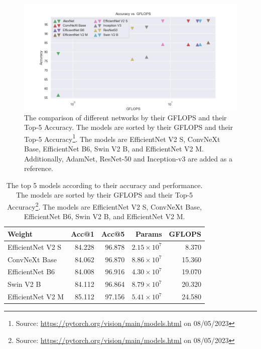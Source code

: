 \begin{figure}
  \centering
  \includegraphics[width=\linewidth]{figures/network/networks.png}
  \caption[Network comparison]{The comparison of different networks by their GFLOPS and their Top-5 Accuracy. The models are sorted by their GFLOPS and their Top-5 Accuracy\footnote{Source: \url{https://pytorch.org/vision/main/models.html} on 08/05/2023}. The models are EfficientNet V2 S, ConvNeXt Base, EfficientNet B6, Swin V2 B, and EfficientNet V2 M. Additionally, AdamNet, ResNet-50 and Inception-v3 are added as a reference.}
  \label{fig:network_comparison}
\end{figure}

\begin{table}[]
  \caption[Top 5 models for Accuracy and Performance]{The top 5 models according to their accuracy and performance. The models are sorted by their GFLOPS and their Top-5 Accuracy\footnote{Source: \url{https://pytorch.org/vision/main/models.html} on 08/05/2023}. The models are EfficientNet V2 S, ConvNeXt Base, EfficientNet B6, Swin V2 B, and EfficientNet V2 M.}
  \label{tab:network_comparison}
  \begin{tabular}{lrrrr}
    \hline
            Weight &  Acc@1 &  Acc@5 &   Params &  GFLOPS \\
    \hline
  EfficientNet V2 S & 84.228 & 96.878 & $2.15 \times 10^7$ &   8.370 \\
      ConvNeXt Base & 84.062 & 96.870 & $8.86 \times 10^7$ &  15.360 \\
    EfficientNet B6 & 84.008 & 96.916 & $4.30 \times 10^7$ &  19.070 \\
          Swin V2 B & 84.112 & 96.864 & $8.79 \times 10^7$ &  20.320 \\
  EfficientNet V2 M & 85.112 & 97.156 & $5.41 \times 10^7$ &  24.580 \\
  \hline
  \end{tabular}
\end{table}

